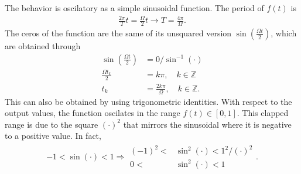 \documentclass[letterpaper,11pt,twoside]{article}
\begin{document}
The behavior is oscilatory as a simple sinusoidal function. The period of $f(t)$ is  
\begin{align*}
  \frac{2\pi}{T}t=\frac{\Omega}{2}t\longrightarrow T=\frac{4\pi}{\Omega}.
\end{align*}
The ceros of the function are the same of its unsquared version $\sin(\frac{\Omega t}{2})$, which are obtained through
\begin{align*}
  \sin\left(\frac{\Omega t}{2}\right)&=0/\sin^{-1}(\cdot)\\
  \frac{\Omega t_k}{2}&=k\pi,\quad k\in\mathbb{Z}\\
  t_k&=\frac{2k\pi}{\Omega},\quad k\in\mathbb{Z}.
\end{align*} 
This can also be obtained by using trigonometric identities.
With respect to the output values, the function oscilates in the range $f(t)\in[0,1]$. This clapped
range is due to the square $(\cdot)^2$ that mirrors the sinusoidal where it is negative to a positive value.
In fact, 
\begin{align*}
  -1<\sin(\cdot)<1\Longrightarrow \begin{array}{rl}
    (-1)^2<&\sin^2(\cdot)<1^2/(\cdot)^2\\
    0<&\sin^2(\cdot)<1
  \end{array}.
\end{align*}

\end{document}
